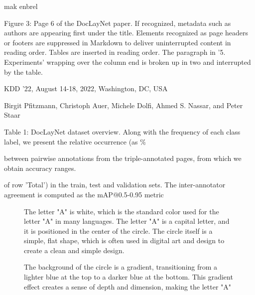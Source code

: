 mak enbrel

Figure 3: Page 6 of the DocLayNet paper. If recognized, metadata such as authors are appearing first under the title. Elements recognized as page headers or footers are suppressed in Markdown to deliver uninterrupted content in reading order. Tables are inserted in reading order. The paragraph in '5. Experiments' wrapping over the column end is broken up in two and interrupted by the table.

KDD '22, August 14-18, 2022, Washington, DC, USA

Birgit Pfitzmann, Christoph Auer, Michele Dolfi, Ahmed S. Nassar, and Peter Staar

Table 1: DocLayNet dataset overview. Along with the frequency of each class label, we present the relative occurrence (as \%

between pairwise annotations from the triple-annotated pages, from which we obtain accuracy ranges.

of row 'Total') in the train, test and validation sets. The inter-annotator agreement is computed as the mAP@0.5-0.95 metric

\begin{figure}[h]

The letter "A" is white, which is the standard color used for the letter "A" in many languages. The letter "A" is a capital letter, and it is positioned in the center of the circle. The circle itself is a simple, flat shape, which is often used in digital art and design to create a clean and simple design.

The background of the circle is a gradient, transitioning from a lighter blue at the top to a darker blue at the bottom. This gradient effect creates a sense of depth and dimension, making the letter "A"
\end{figure}

\begin{figure}[h]
\end{figure}

